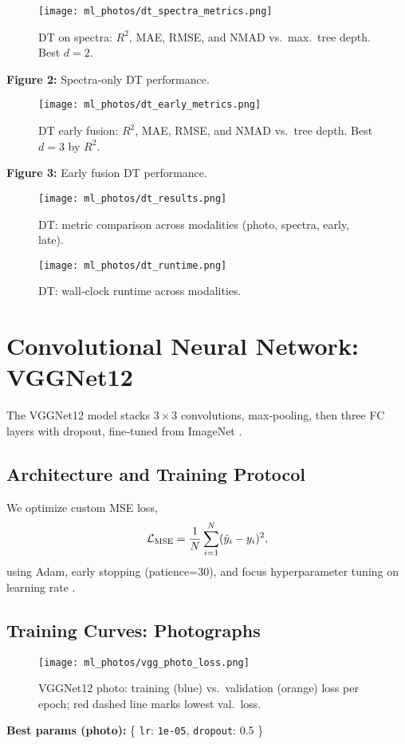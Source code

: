 \documentclass[english,bachelor,oneside]{ctufit-thesis}
\begin{document}
\begin{figure}[H]
  \centering
  \texttt{[image: ml\_photos/dt\_spectra\_metrics.png]}
  \caption{DT on spectra: $R^2$, MAE, RMSE, and NMAD vs.\ max.\ tree depth. Best $d=2$.}
  \label{fig:dt_spectra_metrics}
\end{figure}
\noindent\textbf{Figure 2:} Spectra‐only DT performance.\\

\begin{figure}[H]
  \centering
  \texttt{[image: ml\_photos/dt\_early\_metrics.png]}
  \caption{DT early fusion: $R^2$, MAE, RMSE, and NMAD vs.\ tree depth. Best $d=3$ by $R^2$.}
  \label{fig:dt_early_metrics}
\end{figure}
\noindent\textbf{Figure 3:} Early fusion DT performance.\\

\begin{figure}[H]
  \centering
  \texttt{[image: ml\_photos/dt\_results.png]}
  \caption{DT: metric comparison across modalities (photo, spectra, early, late).}
  \label{fig:dt_results}
\end{figure}

\begin{figure}[H]
  \centering
  \texttt{[image: ml\_photos/dt\_runtime.png]}
  \caption{DT: wall‐clock runtime across modalities.}
  \label{fig:dt_runtime}
\end{figure}

\section{Convolutional Neural Network: VGGNet12}
The VGGNet12 model stacks $3\times3$ convolutions, max‐pooling, then three FC layers with dropout, fine‐tuned from ImageNet \cite{SimonyanZisserman2014}.

\subsection{Architecture and Training Protocol}
We optimize custom MSE loss,
\[
  \mathcal{L}_{\rm MSE} = \frac1N\sum_{i=1}^N (\hat y_i - y_i)^2,
\]
using Adam, early stopping (patience=30), and focus hyperparameter tuning on learning rate \cite{Goodfellow2016,Prechelt1998,Smith2017}.

\subsection{Training Curves: Photographs}
\begin{figure}[H]
  \centering
  \texttt{[image: ml\_photos/vgg\_photo\_loss.png]}
  \caption{VGGNet12 photo: training (blue) vs.\ validation (orange) loss per epoch; red dashed line marks lowest val.\ loss.}
  \label{fig:vgg_photo_loss}
\end{figure}
\noindent\textbf{Best params (photo):} \{ \texttt{lr}: \verb|1e-05|, \texttt{dropout}: 0.5 \}\\
\end{document}
